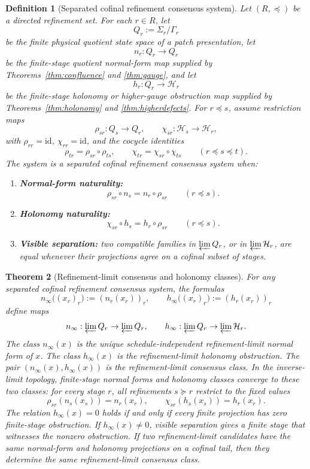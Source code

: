 \documentclass[11pt]{article}
\newtheorem{theorem}{Theorem}[section]
\newtheorem{definition}[theorem]{Definition}
\theoremstyle{remark}
\theoremstyle{plain}
\begin{document}
\begin{definition}[Separated cofinal refinement consensus system]\label{def:refinement-consensus}
Let \((R,\preceq)\) be a directed refinement set. For each \(r\in R\), let
\[
Q_r:=\Sigma_r/\Gamma_r
\]
be the finite physical quotient state space of a patch presentation, let
\[
n_r:Q_r\to Q_r
\]
be the finite-stage quotient normal-form map supplied by Theorems~\ref{thm:confluence} and
\ref{thm:gauge}, and let
\[
h_r:Q_r\to \mathcal H_r
\]
be the finite-stage holonomy or higher-gauge obstruction map supplied by
Theorems~\ref{thm:holonomy} and \ref{thm:higherdefects}. For \(r\preceq s\), assume restriction
maps
\[
\rho_{sr}:Q_s\to Q_r,
\qquad
\chi_{sr}:\mathcal H_s\to\mathcal H_r,
\]
with \(\rho_{rr}=\mathrm{id}\), \(\chi_{rr}=\mathrm{id}\), and the cocycle identities
\[
\rho_{tr}=\rho_{sr}\circ\rho_{ts},
\qquad
\chi_{tr}=\chi_{sr}\circ\chi_{ts}
\qquad
(r\preceq s\preceq t).
\]
The system is a separated cofinal refinement consensus system when:
\begin{enumerate}
\item \textbf{Normal-form naturality:}
\[
\rho_{sr}\circ n_s=n_r\circ\rho_{sr}
\qquad
(r\preceq s).
\]
\item \textbf{Holonomy naturality:}
\[
\chi_{sr}\circ h_s=h_r\circ\rho_{sr}
\qquad
(r\preceq s).
\]
\item \textbf{Visible separation:} two compatible families in \(\varprojlim Q_r\), or in
\(\varprojlim \mathcal H_r\), are equal whenever their projections agree on a cofinal subset of
stages.
\end{enumerate}
\end{definition}

\begin{theorem}[Refinement-limit consensus and holonomy classes]\label{thm:refinement-consensus}
For any separated cofinal refinement consensus system, the formulas
\[
n_\infty\bigl((x_r)_r\bigr):=(n_r(x_r))_r,
\qquad
h_\infty\bigl((x_r)_r\bigr):=(h_r(x_r))_r
\]
define maps
\[
n_\infty:\varprojlim Q_r\to\varprojlim Q_r,
\qquad
h_\infty:\varprojlim Q_r\to\varprojlim\mathcal H_r.
\]
The class \(n_\infty(x)\) is the unique schedule-independent refinement-limit normal form of
\(x\). The class \(h_\infty(x)\) is the refinement-limit holonomy obstruction. The pair
\((n_\infty(x),h_\infty(x))\) is the refinement-limit consensus class. In the inverse-limit
topology, finite-stage normal forms and holonomy classes converge to these two classes: for every
stage \(r\), all refinements \(s\succeq r\) restrict to the fixed values
\[
\rho_{sr}(n_s(x_s))=n_r(x_r),
\qquad
\chi_{sr}(h_s(x_s))=h_r(x_r).
\]
The relation \(h_\infty(x)=0\) holds if and only if every finite projection has zero finite-stage
obstruction. If \(h_\infty(x)\ne0\), visible separation gives a finite stage that witnesses the
nonzero obstruction. If two refinement-limit candidates have the same normal-form and holonomy
projections on a cofinal tail, then they determine the same refinement-limit consensus class.
\end{theorem}
\end{document}
